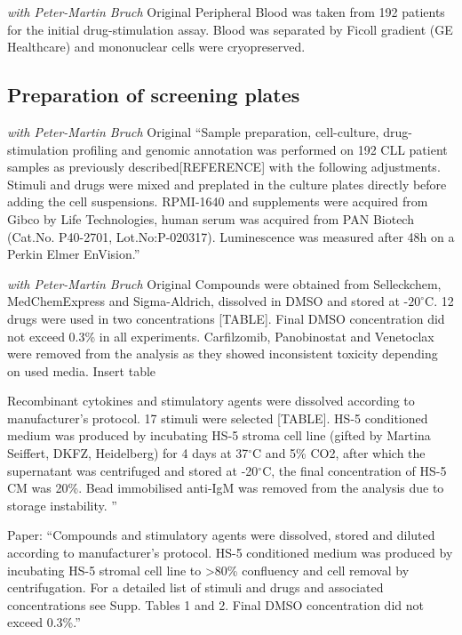 \documentclass[11pt, a4paper, twosided]{book}
\begin{document}
\emph{with Peter-Martin Bruch} Original
Peripheral Blood was taken from 192 patients for the initial drug-stimulation assay. Blood was separated by Ficoll gradient (GE Healthcare) and mononuclear cells were cryopreserved.

\hypertarget{preparation-of-screening-plates}{%
\subsection{Preparation of screening plates}\label{preparation-of-screening-plates}}

\emph{with Peter-Martin Bruch} Original
``Sample preparation, cell-culture, drug-stimulation profiling and genomic annotation was performed on 192 CLL patient samples as previously described{[}REFERENCE{]} with the following adjustments. Stimuli and drugs were mixed and preplated in the culture plates directly before adding the cell suspensions. RPMI-1640 and supplements were acquired from Gibco by Life Technologies, human serum was acquired from PAN Biotech (Cat.No. P40-2701, Lot.No:P-020317). Luminescence was measured after 48h on a Perkin Elmer EnVision.''

\emph{with Peter-Martin Bruch} Original
Compounds were obtained from Selleckchem, MedChemExpress and Sigma-Aldrich, dissolved in DMSO and stored at -\(20^\circ\)C. 12 drugs were used in two concentrations {[}TABLE{]}. Final DMSO concentration did not exceed 0.3\% in all experiments. Carfilzomib, Panobinostat and Venetoclax were removed from the analysis as they showed inconsistent toxicity depending on used media.
Insert table

Recombinant cytokines and stimulatory agents were dissolved according to manufacturer's protocol. 17 stimuli were selected {[}TABLE{]}. HS-5 conditioned medium was produced by incubating HS-5 stroma cell line (gifted by Martina Seiffert, DKFZ, Heidelberg) for 4 days at 37\(^\circ\)C and 5\% CO2, after which the supernatant was centrifuged and stored at -20\(^\circ\)C, the final concentration of HS-5 CM was 20\%. Bead immobilised anti-IgM was removed from the analysis due to storage instability. ''

Paper:
``Compounds and stimulatory agents were dissolved, stored and diluted according to manufacturer's protocol. HS-5 conditioned medium was produced by incubating HS-5 stromal cell line to \textgreater80\% confluency and cell removal by centrifugation. For a detailed list of stimuli and drugs and associated concentrations see Supp. Tables 1 and 2. Final DMSO concentration did not exceed 0.3\%.''
\end{document}
